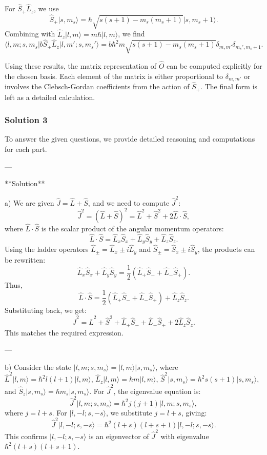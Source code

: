 \documentclass{article}
\begin{document}
For $\hat{S}_+ \hat{L}_z$, we use  
\[
\hat{S}_+ \lvert s, m_s \rangle = \hbar \sqrt{s(s+1) - m_s(m_s+1)} \lvert s, m_s+1 \rangle.
\]  
Combining with $\hat{L}_z \lvert l, m \rangle = m\hbar \lvert l, m \rangle$, we find  
\[
\langle l, m; s, m_s \rvert b \hat{S}_+ \hat{L}_z \lvert l, m'; s, m_s' \rangle = b \hbar^2 m \sqrt{s(s+1) - m_s(m_s+1)} \delta_{m,m'} \delta_{m_s', m_s+1}.
\]  

Using these results, the matrix representation of $\hat{O}$ can be computed explicitly for the chosen basis. Each element of the matrix is either proportional to $\delta_{m,m'}$ or involves the Clebsch-Gordan coefficients from the action of $\hat{S}_+$. The final form is left as a detailed calculation.

\subsubsection{Solution 3}

To answer the given questions, we provide detailed reasoning and computations for each part.

---

**Solution**

a) We are given $\hat{J} = \hat{L} + \hat{S}$, and we need to compute $\hat{J}^2$:
\[
\hat{J}^2 = (\hat{L} + \hat{S})^2 = \hat{L}^2 + \hat{S}^2 + 2 \hat{L} \cdot \hat{S},
\]
where $\hat{L} \cdot \hat{S}$ is the scalar product of the angular momentum operators:
\[
\hat{L} \cdot \hat{S} = \hat{L}_x \hat{S}_x + \hat{L}_y \hat{S}_y + \hat{L}_z \hat{S}_z.
\]
Using the ladder operators $\hat{L}_\pm = \hat{L}_x \pm i\hat{L}_y$ and $\hat{S}_\pm = \hat{S}_x \pm i\hat{S}_y$, the products can be rewritten:
\[
\hat{L}_x \hat{S}_x + \hat{L}_y \hat{S}_y = \frac{1}{2} (\hat{L}_+ \hat{S}_- + \hat{L}_- \hat{S}_+).
\]
Thus,
\[
\hat{L} \cdot \hat{S} = \frac{1}{2} (\hat{L}_+ \hat{S}_- + \hat{L}_- \hat{S}_+) + \hat{L}_z \hat{S}_z.
\]
Substituting back, we get:
\[
\hat{J}^2 = \hat{L}^2 + \hat{S}^2 + \hat{L}_+ \hat{S}_- + \hat{L}_- \hat{S}_+ + 2 \hat{L}_z \hat{S}_z.
\]
This matches the required expression.

---

b) Consider the state $\lvert l, m; s, m_s \rangle = \lvert l, m \rangle \lvert s, m_s \rangle$, where $\hat{L}^2 \lvert l, m \rangle = \hbar^2 l(l+1) \lvert l, m \rangle$, $\hat{L}_z \lvert l, m \rangle = \hbar m \lvert l, m \rangle$, $\hat{S}^2 \lvert s, m_s \rangle = \hbar^2 s(s+1) \lvert s, m_s \rangle$, and $\hat{S}_z \lvert s, m_s \rangle = \hbar m_s \lvert s, m_s \rangle$. For $\hat{J}^2$, the eigenvalue equation is:
\[
\hat{J}^2 \lvert l, m; s, m_s \rangle = \hbar^2 j(j+1) \lvert l, m; s, m_s \rangle,
\]
where $j = l + s$. For $\lvert l, -l; s, -s \rangle$, we substitute $j = l + s$, giving:
\[
\hat{J}^2 \lvert l, -l; s, -s \rangle = \hbar^2 (l+s)(l+s+1) \lvert l, -l; s, -s \rangle.
\]
This confirms $\lvert l, -l; s, -s \rangle$ is an eigenvector of $\hat{J}^2$ with eigenvalue $\hbar^2 (l+s)(l+s+1)$.
\end{document}
